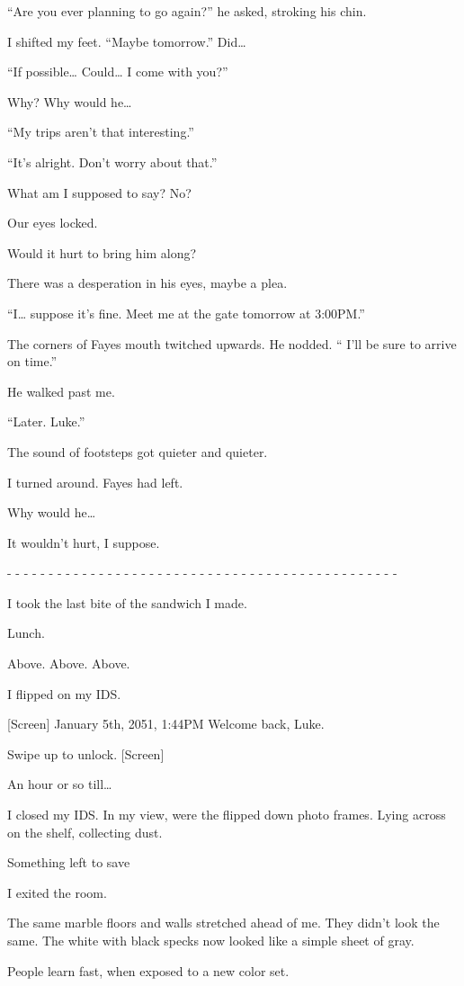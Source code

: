 “Are you ever planning to go again?” he asked, stroking his chin.

I shifted my feet. “Maybe tomorrow.” Did…

“If possible… Could… I come with you?”

Why? Why would he…

“My trips aren’t that interesting.”

“It’s alright. Don’t worry about that.”

What am I supposed to say? No?

Our eyes locked.

Would it hurt to bring him along?

There was a desperation in his eyes, maybe a plea.

“I… suppose it’s fine. Meet me at the gate tomorrow at 3:00PM.”

The corners of Fayes mouth twitched upwards. He nodded. “ I’ll be sure to arrive on time.”

He walked past me.

“Later. Luke.”

The sound of footsteps got quieter and quieter.

I turned around. Fayes had left.

Why would he…

It wouldn’t hurt, I suppose.

- - - - - - - - - - - - - - - - - - - - - - - - - - - - - - - - - - - - - - - - - - - - - - - 

I took the last bite of the sandwich I made.

Lunch. 

Above. Above. Above.

I flipped on my IDS.

[Screen]
January 5th, 2051,  1:44PM
Welcome back, Luke. 

Swipe up to unlock.
[Screen]

An hour or so till…

I closed my IDS. In my view, were the flipped down photo frames. Lying across on the shelf, collecting dust.

Something left to save

I exited the room. 

The same marble floors and walls stretched ahead of me. They didn’t look the same. The white with black specks now looked like a simple sheet of gray.

People learn fast, when exposed to a new color set.

